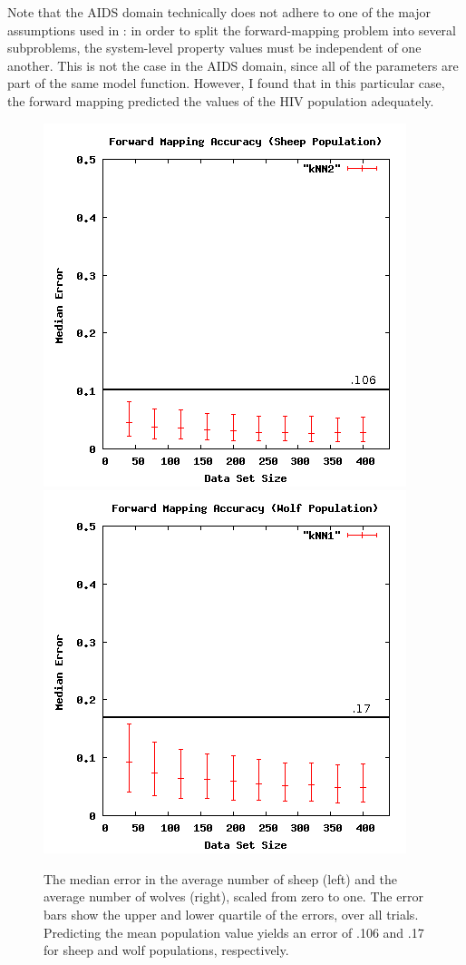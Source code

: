 Note that the AIDS domain technically does not adhere to one of the major assumptions used in \fw: in order to split the forward-mapping problem into several subproblems, the system-level property values must be independent of one another.
This is not the case in the AIDS domain, since all of the parameters are part of the same model function.
However, I found that in this particular case, the forward mapping predicted the values of the HIV population adequately.


\begin{figure}[ht]
\centering
\includegraphics[scale=.4]{images/results_wolfsheep/fm-sheep-pop.png}
\includegraphics[scale=.4]{images/results_wolfsheep/fm-wolf-pop.png}
\caption{The median error in the average number of sheep (left) and the average number of wolves (right), scaled from zero to one.
The error bars show the upper and lower quartile of the errors, over all trials.
Predicting the mean population value yields an error of .106 and .17 for sheep and wolf populations, respectively.}
\label{fig:wolfsheeppop}
\end{figure}

